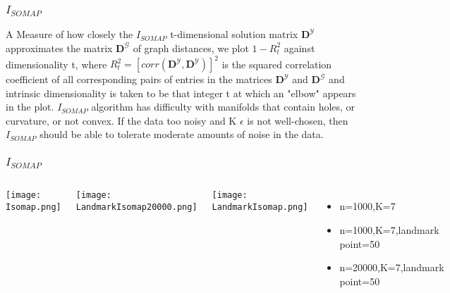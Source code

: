 \documentclass{beamer}
\begin{document}
\begin{frame}
\frametitle{$I_{SOMAP}$}
A Measure of how closely the $I_{SOMAP}$ t-dimensional solution matrix $\textbf{D}^{\mathcal{Y}}$ approximates the matrix $\textbf{D}^{\mathcal{G}}$ of graph distances, we plot $1-R_t^2$ against dimensionality t, where $R_t^2=[corr(\textbf{D}^{\mathcal{Y}},\textbf{D}^{\mathcal{Y}})]^2$ is the squared correlation coefficient of all corresponding pairs of entries in the matrices $\textbf{D}^{\mathcal{Y}}$ and $\textbf{D}^{\mathcal{G}}$ and intrinsic dimensionality is taken to be that integer t at which an "elbow" appears in the plot.\newline \newline 
$I_{SOMAP}$ algorithm has difficulty with manifolds that contain holes, or curvature, or not convex. If the data too noisy and K $\epsilon$ is not well-chosen, then $I_{SOMAP}$ should be able to tolerate moderate amounts of noise in the data.\\
\end{frame}

\begin{frame}
\frametitle{$I_{SOMAP}$}
 \begin{columns}
\begin{minipage}[c][0.4\textheight][c]{\linewidth}
  \centering
  \texttt{[image: Isomap.png]}
\end{minipage}
\begin{minipage}[c][0.4\textheight][c]{\linewidth}
  \centering
  \texttt{[image: LandmarkIsomap20000.png]}
\end{minipage}
\begin{minipage}[c][0.4\textheight][c]{\linewidth}
 
\texttt{[image: LandmarkIsomap.png]}
 
\end{minipage}
\begin{minipage}[c][0.4\textheight][c]{\linewidth}
  \begin{itemize}
\item{n=1000,K=7}  
\item{n=1000,K=7,landmark point=50}
\item{n=20000,K=7,landmark point=50}
  \end{itemize}
  
  \end{minipage}
\end{columns}
\end{frame}
\end{document}
